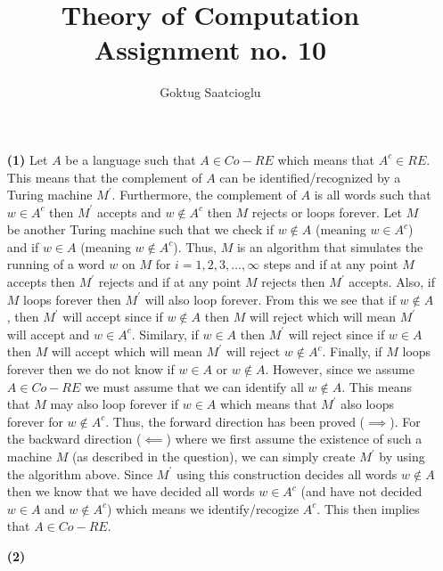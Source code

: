 \documentclass [10pt]{article}
\begin{document}
\title{Theory of Computation Assignment no. 10}
\author{Goktug Saatcioglu}
\date{}
\maketitle

\begin{enumerate}
	\item[\textbf{(1)}]Let $A$ be a language such that $A\in Co-RE$ which means that $A^{c}\in RE$. This means that the complement of $A$ can be identified/recognized by a Turing machine $M^{\prime}$. Furthermore, the complement of $A$ is all words such that $w\in A^{c}$ then $M^{\prime}$ accepts and $w\notin A^{c}$ then $M$ rejects or loops forever. Let $M$ be another Turing machine such that we check if $w\notin A$ (meaning $w\in A^{c}$) and if $w\in A$ (meaning $w\notin A^{c}$). Thus, $M$ is an algorithm that simulates the running of a word $w$ on $M$ for $i=1,2,3,\dots,\infty$ steps and if at any point $M$ accepts then $M^{\prime}$ rejects and if at any point $M$ rejects then $M^{\prime}$ accepts. Also, if $M$ loops forever then $M^{\prime}$ will also loop forever. From this we see that if $w\notin A$, then $M^{\prime}$ will accept since if $w\notin A$ then $M$ will reject which will mean $M^{\prime}$ will accept and $w\in A^{c}$. Similary, if $w\in A$ then $M^{\prime}$ will reject since if $w\in A$ then $M$ will accept which will mean $M^{\prime}$ will reject $w\notin A^{c}$. Finally, if $M$ loops forever then we do not know if $w\in A$ or $w\notin A$. However, since we assume $A\in Co-RE$ we must assume that we can identify all $w\notin A$. This means that $M$ may also loop forever if $w\in A$ which means that $M^{\prime}$ also loops forever for $w\notin A^{c}$. Thus, the forward direction has been proved ($\implies$). For the backward direction ($\impliedby$) where we first assume the existence of such a machine $M$ (as described in the question), we can simply create $M^{\prime}$ by using the algorithm above. Since $M^{\prime}$ using this construction decides all words $w\notin A$ then we know that we have decided all words $w\in A^{c}$ (and have not decided $w\in A$ and $w\notin A^{c}$) which means we identify/recogize $A^{c}$. This then implies that $A\in Co-RE$.
	\item[\textbf{(2)}]
	\begin{enumerate}

\end{enumerate}
\end{enumerate}
\end{document}
